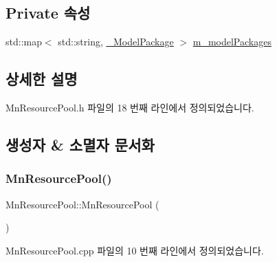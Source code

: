 \subsection*{Private 속성}
\begin{DoxyCompactItemize}
\item 
std\+::map$<$ std\+::string, \hyperlink{struct_m_n_l_1_1_mn_resource_pool_1_1___model_package}{\+\_\+\+Model\+Package} $>$ \hyperlink{class_m_n_l_1_1_mn_resource_pool_a69859b0db46a6965a6d76b3598b33c73}{m\+\_\+model\+Packages}
\end{DoxyCompactItemize}


\subsection{상세한 설명}


Mn\+Resource\+Pool.\+h 파일의 18 번째 라인에서 정의되었습니다.



\subsection{생성자 \& 소멸자 문서화}
\mbox{\label{class_m_n_l_1_1_mn_resource_pool_a3e3bfb192960b20c20d598b87190093a}} 
\subsubsection{\texorpdfstring{Mn\+Resource\+Pool()}{MnResourcePool()}}
{\footnotesize\ttfamily Mn\+Resource\+Pool\+::\+Mn\+Resource\+Pool (\begin{DoxyParamCaption}{ }\end{DoxyParamCaption})}



Mn\+Resource\+Pool.\+cpp 파일의 10 번째 라인에서 정의되었습니다.

\mbox{\label{class_m_n_l_1_1_mn_resource_pool_a22ebe684736fca1eca2632728c957816}} 
